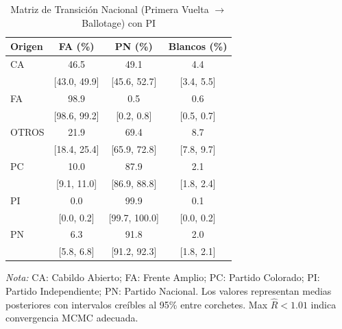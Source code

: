 \begin{table}[htbp]
\centering
\caption{Matriz de Transición Nacional (Primera Vuelta $\rightarrow$ Ballotage) con PI}
\label{tab:national_matrix_pi}
\small
\begin{tabular}{lS[table-format=2.1]S[table-format=2.1]S[table-format=2.1]}
\toprule
{\textbf{Origen}} & {\textbf{FA (\%)}} & {\textbf{PN (\%)}} & {\textbf{Blancos (\%)}} \\
\midrule
CA & 46.5 & 49.1 & 4.4 \\
 & {[43.0, 49.9]} & {[45.6, 52.7]} & {[3.4, 5.5]} \\
FA & 98.9 & 0.5 & 0.6 \\
 & {[98.6, 99.2]} & {[0.2, 0.8]} & {[0.5, 0.7]} \\
OTROS & 21.9 & 69.4 & 8.7 \\
 & {[18.4, 25.4]} & {[65.9, 72.8]} & {[7.8, 9.7]} \\
PC & 10.0 & 87.9 & 2.1 \\
 & {[9.1, 11.0]} & {[86.9, 88.8]} & {[1.8, 2.4]} \\
PI & 0.0 & 99.9 & 0.1 \\
 & {[0.0, 0.2]} & {[99.7, 100.0]} & {[0.0, 0.2]} \\
PN & 6.3 & 91.8 & 2.0 \\
 & {[5.8, 6.8]} & {[91.2, 92.3]} & {[1.8, 2.1]} \\
\bottomrule
\end{tabular}
\begin{flushleft}
\small \textit{Nota:} CA: Cabildo Abierto; FA: Frente Amplio; PC: Partido Colorado; PI: Partido Independiente; PN: Partido Nacional. Los valores representan medias posteriores con intervalos creíbles al 95\% entre corchetes. Max $\hat{R} < 1.01$ indica convergencia MCMC adecuada.
\end{flushleft}
\end{table}
